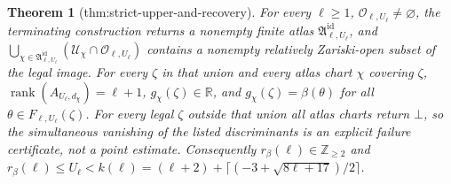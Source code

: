\documentclass{article}
\newtheorem{theorem}{Theorem}
\begin{document}
\begin{theorem}[thm:strict-upper-and-recovery]\label{thm:strict-upper-and-recovery}
For every \(\ell\ge1\), \(\mathcal O_{\ell,U_{\ell}}\ne\varnothing\), the terminating construction returns a nonempty finite atlas \(\mathfrak A^{\mathrm{id}}_{\ell,U_{\ell}}\), and \(\bigcup_{\chi\in\mathfrak A^{\mathrm{id}}_{\ell,U_{\ell}}}(\mathcal U_{\chi}\cap\mathcal O_{\ell,U_{\ell}})\) contains a nonempty relatively Zariski-open subset of the legal image. For every \(\zeta\) in that union and every atlas chart \(\chi\) covering \(\zeta\), \(\operatorname{rank}(A_{U_{\ell},d_{\chi}})=\ell+1\), \(g_{\chi}(\zeta)\in\mathbb R\), and \(g_{\chi}(\zeta)=\beta(\theta)\) for all \(\theta\in F_{\ell,U_{\ell}}(\zeta)\). For every legal \(\zeta\) outside that union all atlas charts return \(\bot\), so the simultaneous vanishing of the listed discriminants is an explicit failure certificate, not a point estimate. Consequently \(r_{\beta}(\ell)\in\mathbb Z_{\ge2}\) and \(r_{\beta}(\ell)\le U_{\ell}<k(\ell)=(\ell+2)+\lceil(-3+\sqrt{8\ell+17})/2\rceil\).
\end{theorem}
\end{document}

